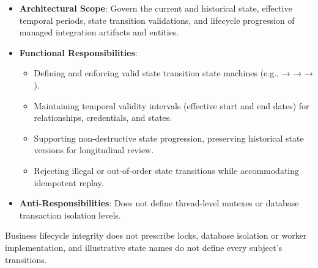 
\begin{itemize}

\item
\textbf{Architectural Scope}: Govern the current and historical state, effective temporal periods, state transition validations, and lifecycle progression of managed integration artifacts and entities.



\item
\textbf{Functional Responsibilities}:


\begin{itemize}

\item
Defining and enforcing valid state transition state machines (e.g., \texttt{} → \texttt{} → \texttt{} → \texttt{}).



\item
Maintaining temporal validity intervals (effective start and end dates) for relationships, credentials, and states.



\item
Supporting non-destructive state progression, preserving historical state versions for longitudinal review.



\item
Rejecting illegal or out-of-order state transitions while accommodating idempotent replay.



\end{itemize}


\item
\textbf{Anti-Responsibilities}: Does not define thread-level mutexes or database transaction isolation levels.



\end{itemize}


Business lifecycle integrity does not prescribe locks, database isolation or worker implementation, and illustrative state names do not define every subject's transitions.



